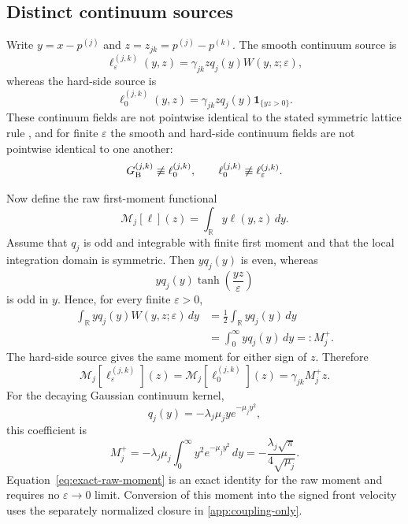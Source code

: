 \documentclass[5p,final]{elsarticle}
\begin{document}
\subsection{Distinct continuum sources}

Write $y=x-p^{(j)}$ and $z=z_{jk}=p^{(j)}-p^{(k)}$. The smooth continuum source is
\begin{equation}
    \ell_\varepsilon^{(j,k)}(y,z)
    =\gamma_{jk}zq_j(y)W(y,z;\varepsilon),
\end{equation}
whereas the hard-side source is
\begin{equation}
    \ell_0^{(j,k)}(y,z)
    =\gamma_{jk}zq_j(y)\mathbf 1_{\{yz>0\}}.
\end{equation}
These continuum fields are not pointwise identical to the stated symmetric lattice rule \cite{BauerDianaGebbie2024}, and for finite $\varepsilon$ the smooth and hard-side continuum fields are not pointwise identical to one another:
\begin{equation}
    G_{\rm B}^{(j,k)}\not\equiv\ell_0^{(j,k)},
    \qquad
    \ell_0^{(j,k)}\not\equiv\ell_\varepsilon^{(j,k)}.
\end{equation}

Now define the raw first-moment functional
\begin{equation}
    \mathcal M_j[\ell](z)
    =\int_{\mathbb R}y\ell(y,z)\,dy.
\end{equation}
Assume that $q_j$ is odd and integrable with finite first moment and that the local integration domain is symmetric. Then $yq_j(y)$ is even, whereas
\begin{equation}
    yq_j(y)\tanh\!\left(\frac{yz}{\varepsilon}\right)
\end{equation}
is odd in $y$. Hence, for every finite $\varepsilon>0$,
\begin{align}
\int_{\mathbb R}yq_j(y)W(y,z;\varepsilon)\,dy
&=\frac12\int_{\mathbb R}yq_j(y)\,dy\\
&=\int_0^\infty yq_j(y)\,dy
=:M_j^+.
\end{align}
The hard-side source gives the same moment for either sign of $z$. Therefore
\begin{equation}
\mathcal M_j[\ell_\varepsilon^{(j,k)}](z)
=\mathcal M_j[\ell_0^{(j,k)}](z)
=\gamma_{jk}M_j^+z.
\label{eq:exact-raw-moment}
\end{equation}
For the decaying Gaussian continuum kernel,
\begin{equation}
    q_j(y)=-\lambda_j\mu_jy e^{-\mu_jy^2},
\end{equation}
this coefficient is
\begin{equation}
    M_j^+
    =-\lambda_j\mu_j\int_0^\infty y^2e^{-\mu_jy^2}\,dy
    =-\frac{\lambda_j\sqrt\pi}{4\sqrt{\mu_j}}.
\end{equation}
Equation~\eqref{eq:exact-raw-moment} is an exact identity for the raw moment and requires no $\varepsilon\to0$ limit. Conversion of this moment into the signed front velocity uses the separately normalized closure in \ref{app:coupling-only}.
\end{document}
